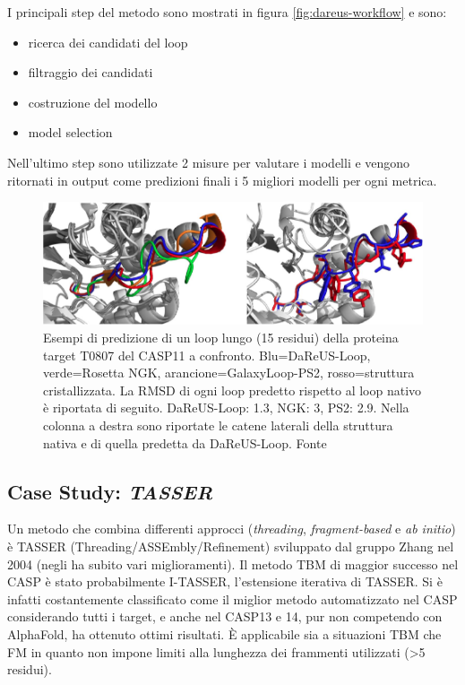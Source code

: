 {{I principali step del metodo sono mostrati in figura \ref{fig:dareus-workflow} e sono:
\begin{itemize}
	\item ricerca dei candidati del loop
	\item filtraggio dei candidati
	\item costruzione del modello
	\item model selection
\end{itemize}

Nell'ultimo step sono utilizzate 2 misure per valutare i modelli e vengono ritornati in output come predizioni finali i 5 migliori modelli per ogni metrica.

\begin{figure}[!htb]
	\centering
	\includegraphics[scale=0.63]{images/dareus-confronto.png}
	\caption{Esempi di predizione di un loop lungo (15 residui) della proteina target T0807 del CASP11 a confronto. Blu=DaReUS-Loop, verde=Rosetta NGK, arancione=GalaxyLoop-PS2, rosso=struttura cristallizzata. La RMSD di ogni loop predetto rispetto al loop nativo è riportata di seguito. DaReUS-Loop: 1.3\angstrom, NGK: 3\angstrom, PS2: 2.9\angstrom. Nella colonna a destra sono riportate le catene laterali della struttura nativa e di quella predetta da DaReUS-Loop. Fonte\cite{karami2018dareus}}
	\label{fig:}
\end{figure}

}

\subsection{Case Study: \textit{TASSER}}

Un metodo che combina differenti approcci (\textit{threading}, \textit{fragment-based} e \textit{ab initio}) è TASSER (Threading/ASSEmbly/Refinement) sviluppato dal gruppo Zhang nel 2004 (negli ha subito vari miglioramenti). Il metodo TBM di maggior successo nel CASP è stato probabilmente I-TASSER, l'estensione iterativa di TASSER. Si è infatti costantemente classificato come il miglior metodo automatizzato nel CASP\supercite{pearce2021deep} considerando tutti i target, e anche nel CASP13 e 14, pur non competendo con AlphaFold, ha ottenuto ottimi risultati. È applicabile sia a situazioni TBM che FM in quanto non impone limiti alla lunghezza dei frammenti utilizzati (>5 residui).

}
